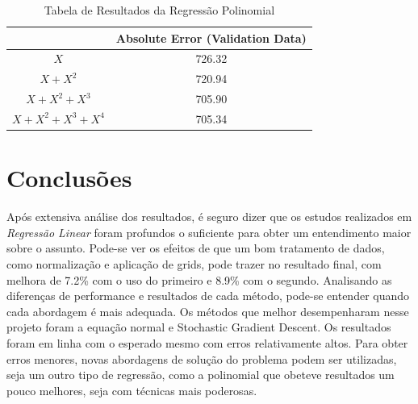 \documentclass[conference]{IEEEtran}
\begin{document}
\begin{table}[H]
\centering
\begin{tabular}{|c|c|}
\hline
               								& Absolute Error (Validation Data) \\ \hline
$X$     											& 726.32                        \\ \hline
$X + X^{2}$ 									& 720.94                        \\ \hline
$X + X^{2} + X^{3}$   				& 705.90                        \\ \hline
$X + X^{2} + X^{3} + X^{4}$   & 705.34                        \\ \hline
\end{tabular}
\caption{Tabela de Resultados da Regressão Polinomial}
\label{table:results_poli}
\end{table}

\section{Conclusões}


Após extensiva análise dos resultados, é seguro dizer que os estudos realizados em \textit{Regressão Linear} foram profundos o suficiente para obter um entendimento maior sobre o assunto.
Pode-se ver os efeitos de que um bom tratamento de dados, como normalização e aplicação de grids, pode trazer no resultado final, com melhora de 7.2\% com o uso do primeiro e 8.9\% com o segundo.
Analisando as diferenças de performance e resultados de cada método, pode-se entender quando cada abordagem é mais adequada. Os métodos que melhor desempenharam nesse projeto foram a equação normal e Stochastic Gradient Descent.
Os resultados foram em linha com o esperado mesmo com erros relativamente altos. Para obter erros menores, novas abordagens de solução do problema podem ser utilizadas, seja um outro tipo de regressão, como a polinomial que obeteve resultados um pouco melhores, seja com técnicas mais poderosas.




\end{document}
